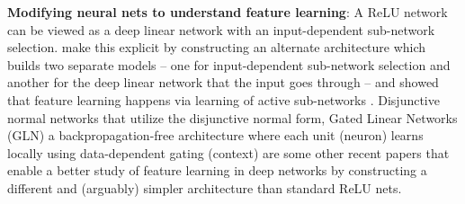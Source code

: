 \documentclass{article} %
\renewcommand{\>}{{\rightarrow}}
\renewcommand{\=}{\stackrel{\triangle}{=}}
\newcommand{\0}{{\mathbf 0}}
\begin{document}
\textbf{Modifying neural nets to understand feature learning}: A ReLU network can be viewed as a deep linear network with an input-dependent sub-network selection. \citet{lakshminarayanan2020neural} make this explicit by constructing an alternate architecture which builds two separate models -- one for input-dependent sub-network selection and another for the deep linear network that the input goes through -- and showed that feature learning happens via learning of active sub-networks . Disjunctive normal networks \citep{sajjadi2016disjunctive} that utilize the disjunctive normal form, Gated Linear Networks (GLN) \citep{veness2021gated, budden2020gaussian, saxe2022neural} a backpropagation-free architecture where each unit (neuron) learns locally using data-dependent gating (context) are some other recent papers that enable a better study of feature learning in deep networks by constructing a different and (arguably) simpler architecture than standard ReLU nets.

\end{document}
